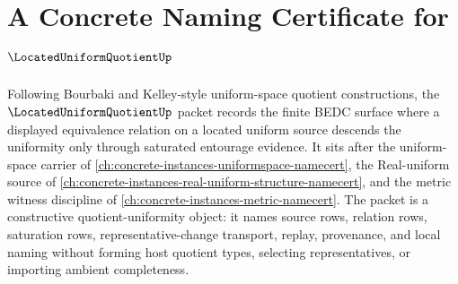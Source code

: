 \chapter{A Concrete Naming Certificate for $\LocatedUniformQuotientUp$}
\label{ch:concrete-instances-located-uniform-quotient-namecert}

Following Bourbaki and Kelley-style uniform-space quotient constructions, the $\LocatedUniformQuotientUp$ packet records the finite BEDC surface where a displayed equivalence relation on a located uniform source descends the uniformity only through saturated entourage evidence. It sits after the uniform-space carrier of \autoref{ch:concrete-instances-uniformspace-namecert}, the Real-uniform source of \autoref{ch:concrete-instances-real-uniform-structure-namecert}, and the metric witness discipline of \autoref{ch:concrete-instances-metric-namecert}. The packet is a constructive quotient-uniformity object: it names source rows, relation rows, saturation rows, representative-change transport, replay, provenance, and local naming without forming host quotient types, selecting representatives, or importing ambient completeness.

